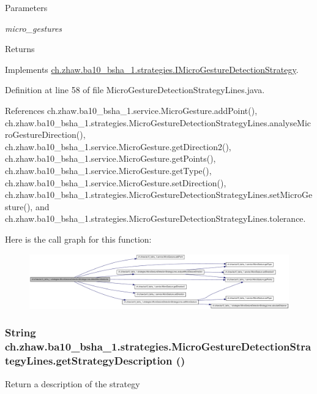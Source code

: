 \begin{DoxyParams}{Parameters}
\item[{\em micro\_\-gestures}]\end{DoxyParams}
\begin{DoxyReturn}{Returns}

\end{DoxyReturn}


Implements \hyperlink{interfacech_1_1zhaw_1_1ba10__bsha__1_1_1strategies_1_1IMicroGestureDetectionStrategy_a8593331fb67e5d4dc890d3db9f2d1b58}{ch.zhaw.ba10\_\-bsha\_\-1.strategies.IMicroGestureDetectionStrategy}.

Definition at line 58 of file MicroGestureDetectionStrategyLines.java.

References ch.zhaw.ba10\_\-bsha\_\-1.service.MicroGesture.addPoint(), ch.zhaw.ba10\_\-bsha\_\-1.strategies.MicroGestureDetectionStrategyLines.analyseMicroGestureDirection(), ch.zhaw.ba10\_\-bsha\_\-1.service.MicroGesture.getDirection2(), ch.zhaw.ba10\_\-bsha\_\-1.service.MicroGesture.getPoints(), ch.zhaw.ba10\_\-bsha\_\-1.service.MicroGesture.getType(), ch.zhaw.ba10\_\-bsha\_\-1.service.MicroGesture.setDirection(), ch.zhaw.ba10\_\-bsha\_\-1.strategies.MicroGestureDetectionStrategyLines.setMicroGesture(), and ch.zhaw.ba10\_\-bsha\_\-1.strategies.MicroGestureDetectionStrategyLines.tolerance.

Here is the call graph for this function:\nopagebreak
\begin{figure}[H]
\begin{center}
\leavevmode
\includegraphics[width=420pt]{classch_1_1zhaw_1_1ba10__bsha__1_1_1strategies_1_1MicroGestureDetectionStrategyLines_ac4a6ad22e6ca3b595006c0b956fdd208_cgraph}
\end{center}
\end{figure}
\hypertarget{classch_1_1zhaw_1_1ba10__bsha__1_1_1strategies_1_1MicroGestureDetectionStrategyLines_a268ab1d51d959092f2d9a68044cc818d}{
\subsubsection[{getStrategyDescription}]{\setlength{\rightskip}{0pt plus 5cm}String ch.zhaw.ba10\_\-bsha\_\-1.strategies.MicroGestureDetectionStrategyLines.getStrategyDescription ()}}
\label{classch_1_1zhaw_1_1ba10__bsha__1_1_1strategies_1_1MicroGestureDetectionStrategyLines_a268ab1d51d959092f2d9a68044cc818d}
Return a description of the strategy

